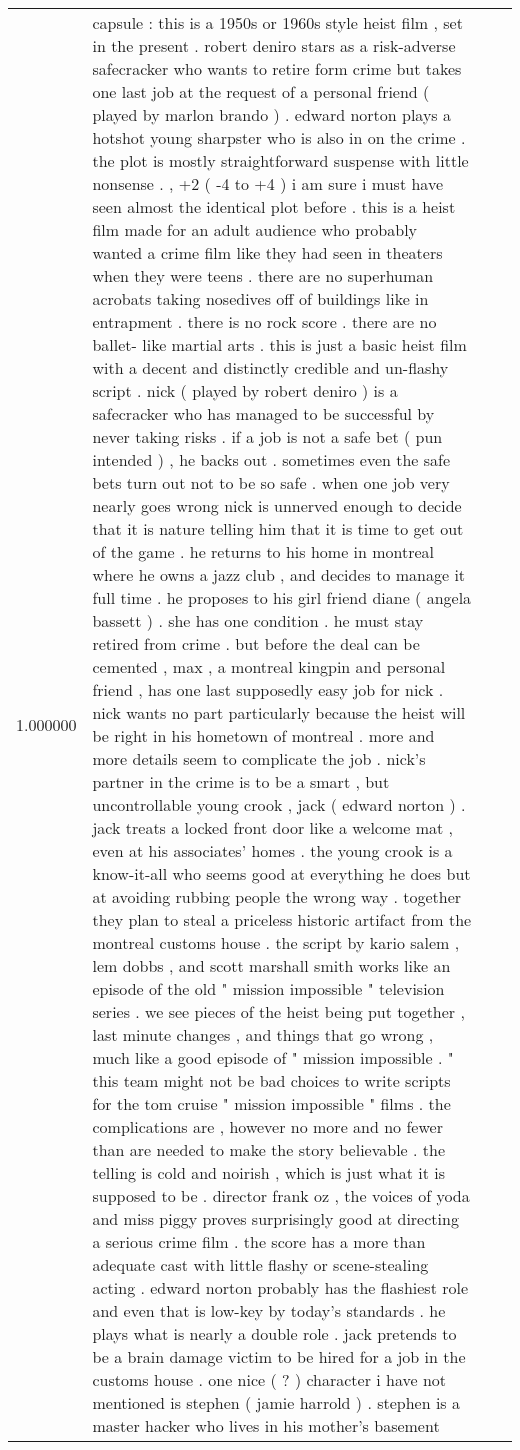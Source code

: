 \begin{tabular}{r{1cm} p{0.4in} r{1cm} p{0.4in}}
1.000000 & capsule : this is a 1950s or 1960s style heist film , set in the present .  robert deniro stars as a risk-adverse safecracker who wants to retire form crime but takes one last job at the request of a personal friend ( played by marlon brando ) .  edward norton plays a hotshot young sharpster who is also in on the crime .  the plot is mostly straightforward suspense with little nonsense .   , +2 ( -4 to +4 )  i am sure i must have seen almost the identical plot before .  this is a heist film made for an adult audience who probably wanted a crime film like they had seen in theaters when they were teens .  there are no superhuman acrobats taking nosedives off of buildings like in entrapment .  there is no rock score .  there are no ballet- like martial arts .  this is just a basic heist film with a decent and distinctly credible and un-flashy script .  nick ( played by robert deniro ) is a safecracker who has managed to be successful by never taking risks .  if a job is not a safe bet ( pun intended ) , he backs out .  sometimes even the safe bets turn out not to be so safe .  when one job very nearly goes wrong nick is unnerved enough to decide that it is nature telling him that it is time to get out of the game .  he returns to his home in montreal where he owns a jazz club , and decides to manage it full time .  he proposes to his girl friend diane ( angela bassett ) .  she has one condition .  he must stay retired from crime .  but before the deal can be cemented , max , a montreal kingpin and personal friend , has one last supposedly easy job for nick .  nick wants no part particularly because the heist will be right in his hometown of montreal .  more and more details seem to complicate the job .  nick's partner in the crime is to be a smart , but uncontrollable young crook , jack ( edward norton ) .  jack treats a locked front door like a welcome mat , even at his associates' homes .  the young crook is a know-it-all who seems good at everything he does but at avoiding rubbing people the wrong way .  together they plan to steal a priceless historic artifact from the montreal customs house .  the script by kario salem , lem dobbs , and scott marshall smith works like an episode of the old " mission impossible " television series .  we see pieces of the heist being put together , last minute changes , and things that go wrong , much like a good episode of " mission impossible . "  this team might not be bad choices to write scripts for the tom cruise " mission impossible " films .  the complications are , however no more and no fewer than are needed to make the story believable .  the telling is cold and noirish , which is just what it is supposed to be .  director frank oz , the voices of yoda and miss piggy proves surprisingly good at directing a serious crime film .  the score has a more than adequate cast with little flashy or scene-stealing acting .  edward norton probably has the flashiest role and even that is low-key by today's standards .  he plays what is nearly a double role .  jack pretends to be a brain damage victim to be hired for a job in the customs house .  one nice ( ? )  character i have not mentioned is stephen ( jamie harrold ) .  stephen is a master hacker who lives in his mother's basement 
\end{tabular}
